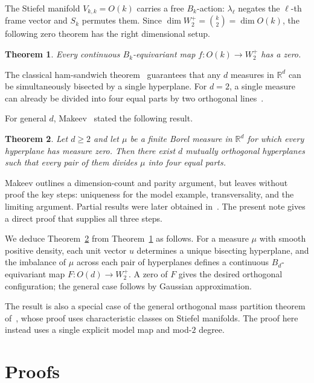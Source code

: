 \documentclass[10pt,a4paper]{amsart}
\newtheorem{thm}{Theorem}[section]
\begin{document}
\medskip

The Stiefel manifold $V_{k,k}=O(k)$ carries a free $B_k$-action:
$\lambda_\ell$ negates the $\ell$-th frame vector and $S_k$
permutes them.  Since $\dim W_2^+=\binom{k}{2}=\dim O(k)$,
the following zero theorem has the right dimensional setup.


\begin{thm}\label{main}
Every continuous $B_k$-equivariant map $f:O(k)\to W_2^+$ has a zero.
\end{thm}


\medskip

The classical ham-sandwich theorem~\cite{ST} guarantees that any
$d$ measures in $\mathbb{R}^d$ can be simultaneously bisected by a
single hyperplane.  For $d=2$, a single measure can already be
divided into four equal parts by two orthogonal lines~\cite{Shashkin}.

For general $d$, Makeev~\cite{Mak07} stated the following result.

\begin{thm}\label{mak}
Let $d\ge2$ and let $\mu$ be a finite Borel measure in $\mathbb{R}^d$
for which every hyperplane has measure zero.  Then there exist $d$
mutually orthogonal hyperplanes such that every pair of them divides
$\mu$ into four equal parts.
\end{thm}

Makeev outlines a dimension-count and parity argument, but leaves
without proof the key steps: uniqueness for the model example,
transversality, and the limiting argument.
Partial results were later obtained in~\cite{BK12,Mejia25}.
The present note gives a direct proof that supplies all three steps.

We deduce Theorem~\ref{mak} from Theorem~\ref{main} as follows.
For a measure $\mu$ with smooth positive density, each unit vector
$u$ determines a unique bisecting hyperplane, and the imbalance
of $\mu$ across each pair of hyperplanes defines a continuous
$B_d$-equivariant map $F:O(d)\to W_2^+$.
A zero of $F$ gives the desired orthogonal configuration;
the general case follows by Gaussian approximation.

The result is also a special case of the general orthogonal mass
partition theorem of~\cite{Mus26}, whose proof uses characteristic
classes on Stiefel manifolds.  The proof here instead uses a single
explicit model map and mod-$2$ degree.

\section{Proofs}
\end{document}
